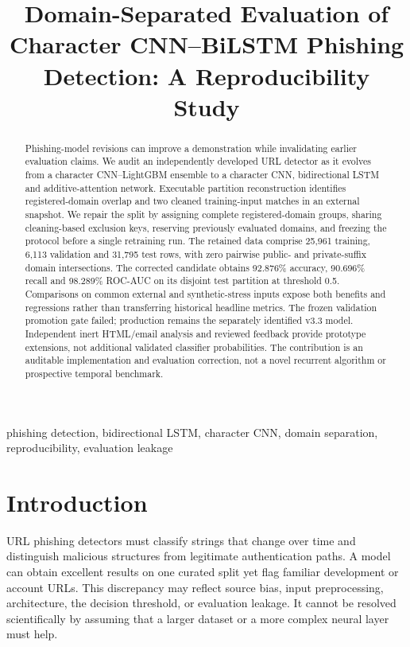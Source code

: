 \documentclass[conference,a4paper]{IEEEtran}
\title{Domain-Separated Evaluation of Character CNN--BiLSTM Phishing Detection: A Reproducibility Study}
\author{\IEEEauthorblockN{D Sunidhi, P Manvitha, G Likith}
\IEEEauthorblockA{Department of Computer Science and Information Technology\\KLH Bachupally}}
\begin{document}
\maketitle
\begin{abstract}
Phishing-model revisions can improve a demonstration while invalidating earlier evaluation claims. We audit an independently developed URL detector as it evolves from a character CNN--LightGBM ensemble to a character CNN, bidirectional LSTM and additive-attention network. Executable partition reconstruction identifies registered-domain overlap and two cleaned training-input matches in an external snapshot. We repair the split by assigning complete registered-domain groups, sharing cleaning-based exclusion keys, reserving previously evaluated domains, and freezing the protocol before a single retraining run. The retained data comprise 25,961 training, 6,113 validation and 31,795 test rows, with zero pairwise public- and private-suffix domain intersections. The corrected candidate obtains 92.876\% accuracy, 90.696\% recall and 98.289\% ROC-AUC on its disjoint test partition at threshold 0.5. Comparisons on common external and synthetic-stress inputs expose both benefits and regressions rather than transferring historical headline metrics. The frozen validation promotion gate failed; production remains the separately identified v3.3 model. Independent inert HTML/email analysis and reviewed feedback provide prototype extensions, not additional validated classifier probabilities. The contribution is an auditable implementation and evaluation correction, not a novel recurrent algorithm or prospective temporal benchmark.
\end{abstract}
\begin{IEEEkeywords}phishing detection, bidirectional LSTM, character CNN, domain separation, reproducibility, evaluation leakage\end{IEEEkeywords}

\section{Introduction}
URL phishing detectors must classify strings that change over time and distinguish malicious structures from legitimate authentication paths. A model can obtain excellent results on one curated split yet flag familiar development or account URLs. This discrepancy may reflect source bias, input preprocessing, architecture, the decision threshold, or evaluation leakage. It cannot be resolved scientifically by assuming that a larger dataset or a more complex neural layer must help.
\end{document}
